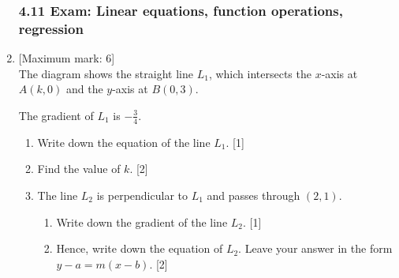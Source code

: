 \documentclass[12pt, twoside]{article}
\begin{document}
\begin{enumerate}
    \subsubsection*{4.11 Exam: Linear equations, function operations, regression}

    \item {[Maximum mark: 6]} \\[0.3cm]
    The diagram shows the straight line $L_1$, which intersects the $x$-axis at $A(k, 0)$ and the $y$-axis at $B(0,3)$.
        \begin{center}
        \end{center}
        The gradient of $L_1$ is $-\frac{3}{4}$.
        \begin{enumerate}%
            \item Write down the equation of the line $L_1$. \hfill [1]
            \item Find the value of $k$. \hfill [2]
            \item The line $L_2$ is perpendicular to $L_1$ and passes through $(2,1)$.
                \begin{enumerate}
                    \item Write down the gradient of the line $L_2$. \hfill [1]
                    \item Hence, write down the equation of $L_2$. Leave your answer in the form \\ $y-a=m(x-b)$. \hfill [2]
                \end{enumerate}
        \end{enumerate}


\end{enumerate}
\end{document}

